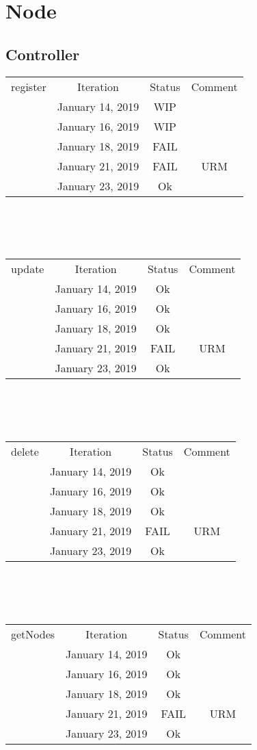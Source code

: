 \documentclass{scrreprt}
\begin{document}
\section{Node}

\subsection{Controller}
	\begin{tabularx}{12cm}{X|c|c|c}
		register & Iteration & Status & Comment  \\
		& January 14, 2019 & WIP & \\
		& January 16, 2019 & WIP & \\
		& January 18, 2019 & FAIL & \\
		& January 21, 2019 & FAIL & URM \\
		& January 23, 2019 & Ok & \\
	\end{tabularx}	
	\\ \\ \\
	\begin{tabularx}{12cm}{X|c|c|c}
		update & Iteration & Status & Comment  \\
		& January 14, 2019 & Ok & \\
		& January 16, 2019 & Ok & \\
		& January 18, 2019 & Ok & \\
		& January 21, 2019 & FAIL & URM \\
		& January 23, 2019 & Ok & \\
	\end{tabularx}	
	\\ \\ \\
	\begin{tabularx}{12cm}{X|c|c|c}
		delete & Iteration & Status & Comment  \\
		& January 14, 2019 & Ok & \\
		& January 16, 2019 & Ok & \\
		& January 18, 2019 & Ok & \\
		& January 21, 2019 & FAIL & URM \\
		& January 23, 2019 & Ok & \\
	\end{tabularx}	
	\\ \\ \\
	\begin{tabularx}{12cm}{X|c|c|c}
		getNodes & Iteration & Status & Comment  \\
		& January 14, 2019 & Ok & \\
		& January 16, 2019 & Ok & \\
		& January 18, 2019 & Ok & \\
		& January 21, 2019 & FAIL & URM \\ 
		& January 23, 2019 & Ok & \\
	\end{tabularx}	
\end{document}
